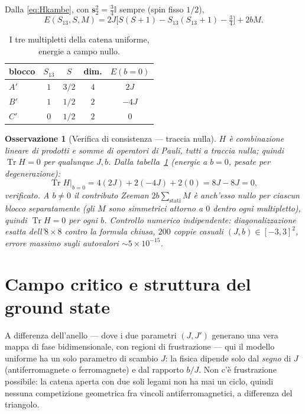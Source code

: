 \documentclass[11pt,a4paper]{article}
\newtheorem{osservazione}{Osservazione}
\begin{document}
Dalla \eqref{eq:Hkambe}, con $\mathbf s_2^2=\tfrac34\mathbb{I}$ sempre (spin
fisso $1/2$),
\begin{equation}
E(S_{13},S,M) = 2J\Big[S(S+1)-S_{13}(S_{13}+1)-\tfrac34\Big] + 2bM .
\label{eq:spettro}
\end{equation}

\begin{table}[h]
\centering
\begin{tabular}{@{}lcccc@{}}
\toprule
blocco & $S_{13}$ & $S$ & dim. & $E(b=0)$\\
\midrule
$A'$ & $1$ & $3/2$ & $4$ & $2J$ \\
$B'$ & $1$ & $1/2$ & $2$ & $-4J$ \\
$C'$ & $0$ & $1/2$ & $2$ & $0$ \\
\bottomrule
\end{tabular}
\caption{I tre multipletti della catena uniforme, energie a campo nullo.}
\label{tab:multipletti}
\end{table}

\begin{osservazione}[Verifica di consistenza — traccia nulla]
$H$ è combinazione lineare di prodotti e somme di operatori di Pauli, tutti
a traccia nulla; quindi $\operatorname{Tr}H=0$ per qualunque $J,b$. Dalla
tabella~\ref{tab:multipletti} (energie a $b=0$, pesate per degenerazione):
\[
\operatorname{Tr}H\big|_{b=0} = 4(2J)+2(-4J)+2(0) = 8J-8J = 0,
\]
verificato. A $b\neq0$ il contributo Zeeman $2b\sum_{\text{stati}}M$ è
anch'esso nullo per ciascun blocco separatamente (gli $M$ sono simmetrici
attorno a $0$ dentro ogni multipletto), quindi $\operatorname{Tr}H=0$ per
ogni $b$. Controllo numerico indipendente: diagonalizzazione esatta
dell'$8\times8$ contro la formula chiusa, $200$ coppie casuali $(J,b)\in[-3,3]^2$,
errore massimo sugli autovalori $\sim5\times10^{-15}$.
\end{osservazione}

\section{Campo critico e struttura del ground state}
\label{sec:critico}

A differenza dell'anello — dove i due parametri $(J,J')$ generano una vera
mappa di fase bidimensionale, con regioni di frustrazione — qui il modello
uniforme ha un solo parametro di scambio $J$: la fisica dipende solo dal
\emph{segno} di $J$ (antiferromagnete o ferromagnete) e dal rapporto $b/J$.
Non c'è frustrazione possibile: la catena aperta con due soli legami non ha
mai un ciclo, quindi nessuna competizione geometrica fra vincoli
antiferromagnetici, a differenza del triangolo.
\end{document}
